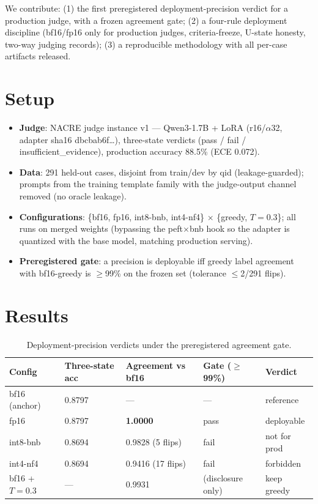 \documentclass[11pt]{article}
\begin{document}
We contribute: (1) the first preregistered deployment-precision verdict for a
production judge, with a frozen agreement gate; (2) a four-rule deployment
discipline (bf16/fp16 only for production judges, criteria-freeze, U-state
honesty, two-way judging records); (3) a reproducible methodology with all
per-case artifacts released.

\section{Setup}
\begin{itemize}
  \item \textbf{Judge}: NACRE judge instance v1 --- Qwen3-1.7B + LoRA (r16/$\alpha$32,
        adapter sha16 dbcbab6f\ldots), three-state verdicts (pass / fail /
        insufficient\_evidence), production accuracy 88.5\% (ECE 0.072).
  \item \textbf{Data}: 291 held-out cases, disjoint from train/dev by qid
        (leakage-guarded); prompts from the training template family with the
        judge-output channel removed (no oracle leakage).
  \item \textbf{Configurations}: \{bf16, fp16, int8-bnb, int4-nf4\} $\times$
        \{greedy, $T{=}0.3$\}; all runs on merged weights (bypassing the
        peft$\times$bnb hook so the adapter is quantized with the base model,
        matching production serving).
  \item \textbf{Preregistered gate}: a precision is deployable iff greedy label
        agreement with bf16-greedy is $\geq$99\% on the frozen set (tolerance
        $\leq$2/291 flips).
\end{itemize}

\section{Results}

\begin{table}[h]
\centering
\begin{tabular}{lllll}
\toprule
Config & Three-state acc & Agreement vs bf16 & Gate ($\geq$99\%) & Verdict \\
\midrule
bf16 (anchor) & 0.8797 & --- & --- & reference \\
fp16 & 0.8797 & \textbf{1.0000} & pass & deployable \\
int8-bnb & 0.8694 & 0.9828 (5 flips) & fail & not for prod \\
int4-nf4 & 0.8694 & 0.9416 (17 flips) & fail & forbidden \\
bf16 + $T{=}0.3$ & --- & 0.9931 & (disclosure only) & keep greedy \\
\bottomrule
\end{tabular}
\caption{Deployment-precision verdicts under the preregistered agreement gate.}
\label{tab:verdicts}
\end{table}
\end{document}
